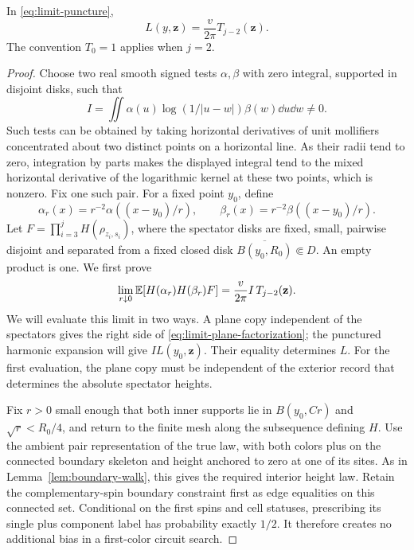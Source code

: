 \begin{proposition}
\label{prop:collision}
In \eqref{eq:limit-puncture},
\begin{equation}
              L(y,\mathbf z)=\frac{v}{2\pi}T_{j-2}(\mathbf z).
 \label{eq:limit-collision}
\end{equation}
The convention \(T_0=1\) applies when \(j=2\).
\end{proposition}

\begin{proof}
Choose two real smooth signed tests \(\alpha,\beta\) with zero
integral, supported in disjoint disks, such that
\[
 I=\iint\alpha(u)\log(1/|u-w|)\beta(w)\dd u\dd w\ne0.
\]
Such tests can be obtained by taking horizontal derivatives of
unit mollifiers concentrated about two distinct points on a
horizontal line.  As their radii tend to zero, integration by parts
makes the displayed integral tend to the mixed horizontal derivative
of the logarithmic kernel at these two points, which is nonzero.
Fix one such pair.  For a fixed point \(y_0\), define
\[
 \alpha_r(x)=r^{-2}\alpha((x-y_0)/r),\qquad
 \beta_r(x)=r^{-2}\beta((x-y_0)/r).
\]
Let \(F=\prod_{i=3}^jH(\rho_{z_i,s_i})\), where the spectator disks
are fixed, small, pairwise disjoint and separated from a fixed
closed disk \(\overline{B(y_0,R_0)}\Subset D\).
An empty product is one.  We first prove
\begin{equation}
 \lim_{r\downarrow0}
       \mathbb E[H(\alpha_r)H(\beta_r)F]
          =\frac{v}{2\pi}I\,T_{j-2}(\mathbf z).
 \label{eq:limit-plane-factorization}
\end{equation}
We will evaluate this limit in two ways.  A plane copy independent of
the spectators gives the right side of
\eqref{eq:limit-plane-factorization}; the punctured harmonic expansion
will give \(I L(y_0,\mathbf z)\).  Their equality determines \(L\).
For the first evaluation, the plane copy must be independent of the
exterior record that determines the absolute spectator heights.

Fix \(r>0\) small enough that both inner supports lie in
\(B(y_0,Cr)\) and \(\sqrt r<R_0/4\), and return to the finite
mesh along the subsequence defining \(H\).
Use the ambient pair representation of the true law, with both
colors plus on the connected boundary skeleton and height anchored
to zero at one of its sites.  As in Lemma~\ref{lem:boundary-walk},
this gives the required interior height law.
Retain the complementary-spin boundary constraint first as edge
equalities on this connected set.  Conditional on the first spins
and cell statuses, prescribing its single plus component label has
probability exactly \(1/2\).  It therefore creates no additional
bias in a first-color circuit search.


\end{proof}
